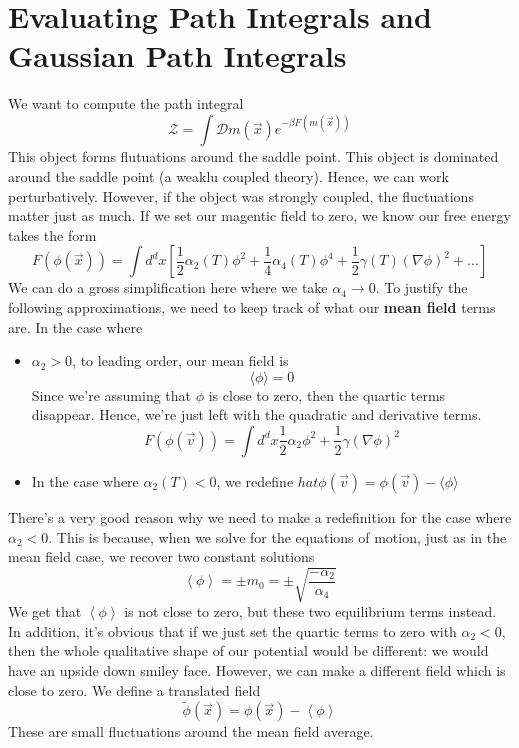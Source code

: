 \documentclass[11pt, oneside]{article}   	%
\begin{document}
\pagebreak


\section{Evaluating Path Integrals and Gaussian Path Integrals }
We want to compute the path integral 
\[
	\mathcal{ Z} = \int \mathcal{D}m ( \vec{x}) e^ { - \beta F( m ( \vec{x}) ) } 
\] This object forms flutuations around the saddle point. 
This object is dominated around the saddle point (a weaklu coupled theory). 
Hence, we can work perturbatively. 
However, if the object was strongly coupled, the fluctuations matter just as much. 
If we set our magentic field to zero, we know our free energy takes the form 
\[
	F( \phi ( \vec{x}) )  = \int d^{d}x \left[ \frac{1}{2} \alpha_2(T ) \phi^2 + \frac{1}{4}\alpha_4(T) \phi^{4} + \frac{1}{ 2} \gamma( T ) ( \nabla \phi)^2 + \dots  \right] 
\] We can do a gross simplification here where we take $\alpha_4 \to 0 $.
To justify the following approximations, we need to keep track of what our 
\textbf{mean field} terms are. 
In the case where 
\begin{itemize}
	\item $\alpha_2 > 0 $, to leading order, our mean field is 
		\[
			\langle \phi \rangle  = 0
		\]  Since we're assuming that $\phi $ is close to zero, then 
		the quartic terms disappear. Hence, we're just left with 
		the quadratic and derivative terms. 
		\[
			F ( \phi( \vec{v}) ) = \int d^{d} x \frac{1}{2} \alpha_2 \phi^2 + \frac{1}{2 } \gamma ( \nabla \phi ) ^ 2  
		\] 
	\item In the case where $\alpha_2 ( T ) < 0 $, we redefine 
		$ hat{\phi }( \vec{v}) = \phi ( \vec{v})  - \langle \phi \rangle  $	


\end{itemize} 
There's a very good reason why we need to make a redefinition 
for the case where $\alpha_2 < 0 $. This is because, when we solve for the equations of motion, 
just as in the mean field case, we recover two constant solutions 
\[
 \left< \phi \right> = \pm m_0 = \pm \sqrt{ \frac{ - \alpha_2 }{\alpha_4 }} 
\] We get that $ \left< \phi \right> $ is not close to zero, but these
two equilibrium terms instead. 
In addition, it's obvious that if we just set the quartic terms to zero 
with $ \alpha_2 < 0 $, then the whole qualitative shape of our potential 
would be different: we would have an upside down smiley face.  
However, we can make a different field which is close to zero. We define a translated field
\[
	\widetilde{ \phi }( \vec{x})  = \phi ( \vec{x})  - \left< \phi \right>
\] These are small fluctuations around the mean field average. 
\end{document}
